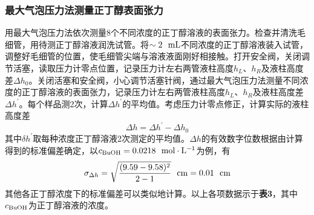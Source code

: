 \documentclass[12pt]{article}
\begin{document}
 \subsubsection{最大气泡压力法测量正丁醇表面张力}
 用最大气泡压力法依次测量8个不同浓度的正丁醇溶液的表面张力。检查并清洗毛细管，用待测正丁醇溶液润洗试管。将$\sim 2\ \ {\rm mL}$不同浓度的正丁醇溶液装入试管，调整好毛细管的位置，使毛细管尖端与溶液液面刚好相接触。打开安全阀，关闭调节活塞，读取压力计零点位置，记录压力计左右两管液柱高度$h_{L}$、$h_{R}$及液柱高度差$\Delta h_{0}$。关闭活塞和安全阀，小心调节活塞针阀，通过最大气泡压力法测量不同浓度的正丁醇溶液的表面张力，记录压力计左右两管液柱高度$h_{L}$、$h_{R}$及液柱高度差$\Delta h^{\prime}$。每个样品测2次，计算$\Delta h^{\prime}$的平均值。考虑压力计零点修正，计算实际的液柱高度差
 $$
 \Delta h=\Delta h^{\prime}-\Delta h_{0}
 $$
 其中$\delta h^{\prime}$取每种浓度正丁醇溶液2次测定的平均值。$\Delta h$的有效数字位数根据由计算得到的标准偏差确定，以$c_{\rm BuOH}=0.0218\ \ {\rm mol\cdot L^{-1}}$为例，有
 $$
 \sigma_{\Delta h}=\sqrt{\frac{(9.59-9.58)^{2}}{2-1}}\ \ {\rm cm}=0.01\ \ {\rm cm}
 $$
 其他各正丁醇浓度下的标准偏差可以类似地计算。以上各项数据示于\textbf{表3}，其中$c_{\rm BuOH}$为正丁醇溶液的浓度。
\end{document}
